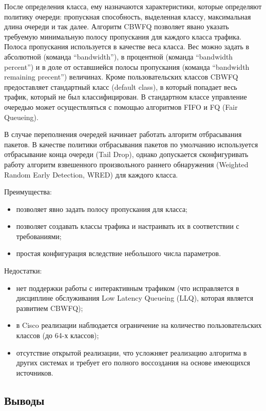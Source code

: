     После определения класса, ему назначаются характеристики, которые определяют
    политику очереди: пропускная способность, выделенная классу, максимальная
    длина очереди и так далее. Алгоритм CBWFQ позволяет явано указать требуемую минимальную
    полосу пропускания для каждого класса трафика. Полоса пропускания используется
    в качестве веса класса. Вес можно задать в абсолютной (команда ``bandwidth''),
    в процентной (команда ``bandwidth percent'') и в доле от оставшиейся
    полосы пропускания (команда ``bandwidth remaining precent'') величинах.
    Кроме пользовательских классов CBWFQ предоставляет стандартный класс (default class),
    в который попадает весь трафик, который не был классифицирован. В стандартном классе
    управление очередью может осуществляться с помощью алгоритмов FIFO и FQ (Fair Queueing). \cite{ciscoguide} 

    В случае переполнения очередей начинает работать алгоритм отбрасывания пакетов.
    В качестве политики отбрасывания пакетов по умолчанию используется отбрасывание конца
    очереди (Tail Drop), однако допускается сконфигуривать работу
    алгоритм взвешенного произвольного раннего обнаружения (Weighted Random Early Detection, WRED)
    для каждого класса.\cite{ciscoguide}

	Преимущества:
	\begin{itemize}
		\item позволяет явно задать полосу пропускания для класса;
		\item позволяет создавать классы трафика и настраивать их в соответствии с требованиями;
		\item простая конфигурация вследствие небольшого числа параметров.\cite{Vagesna}\cite{ciscoguide}
	\end{itemize}

	Недостатки:
	\begin{itemize}
		\item нет поддержки работы с интерактивным трафиком (что исправляется в дисциплине обслуживания Low Latency Queueing (LLQ),
		которая является развитием CBWFQ);
		\item в Cisco реализации наблюдается ограничение на количество пользовательских классов (до 64-х классов);\cite{Vagesna}
		\item отсутствие открытой реализации, что усложняет реализацию алгоритма в других системах и требует его полного воссоздания
		на основе имеющихся источников.
	\end{itemize}

	\subsection{Выводы}

